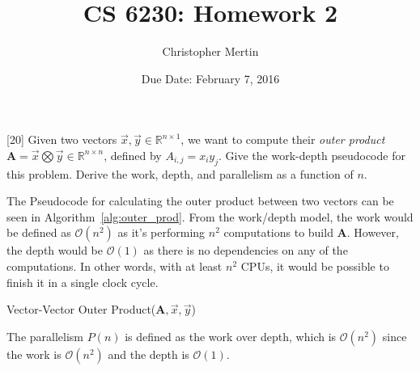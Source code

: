 \documentclass[addpoints]{exam}
\title{CS 6230: Homework 2}
\date{Due Date: February 7, 2016}
\author{Christopher Mertin}
\newcommand{\BigO}[1]{\mathcal{O}\left( #1\right)}
\begin{document}
\maketitle

\pointname{}
\bonuspointname{}
\pointformat{[\bfseries\thepoints]}

\printanswers



\begin{questions}

[20]
Given two vectors $\vec{x},\vec{y}\in\mathbb{R}^{n\times 1}$, we want to compute their {\em outer product} $\mathbf{A}=\vec{x}\bigotimes \vec{y}\in \mathbb{R}^{n\times n}$, defined by $A_{i,j}=x_{i}y_{j}$. Give the work-depth pseudocode for this problem. Derive the work, depth, and parallelism as a function of $n$.

\begin{solution}
The Pseudocode for calculating the outer product between two vectors can be seen in Algorithm~\ref{alg:outer_prod}. From the work/depth model, the work would be defined as $\BigO{n^{2}}$ as it's performing $n^{2}$ computations to build $\mathbf{A}$. However, the depth would be $\BigO{1}$ as there is no dependencies on any of the computations. In other words, with at least $n^{2}$ CPUs, it would be possible to finish it in a single clock cycle.
\begin{algorithm}[H]
\caption{Vector-Vector Outer Product($\mathbf{A}, \vec{x}, \vec{y}$)}
\begin{algorithmic}[1]
  \ENDFOR
\ENDFOR
{}
\end{algorithmic}
\label{alg:outer_prod}
\end{algorithm}

The parallelism $P(n)$ is defined as the work over depth, which is $\BigO{n^{2}}$ since the work is $\BigO{n^{2}}$ and the depth is $\BigO{1}$.


\end{solution}
\end{questions}
\end{document}
